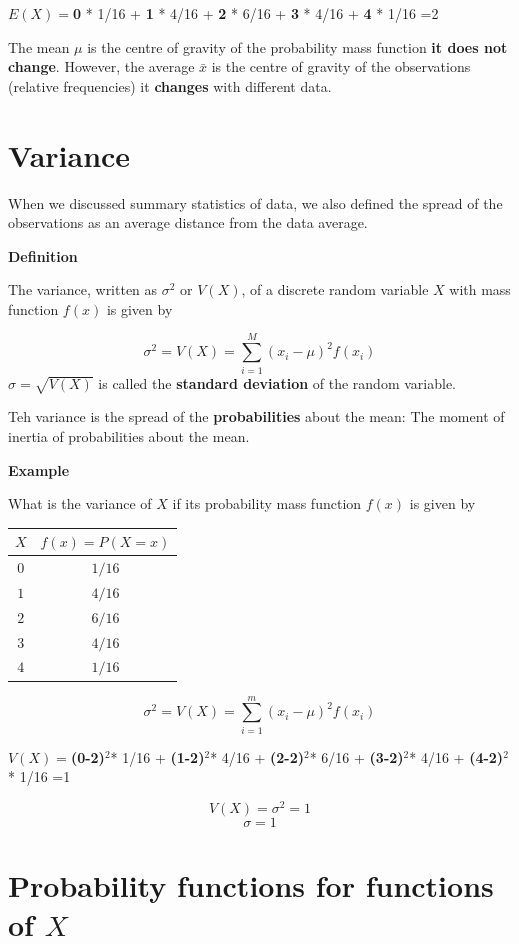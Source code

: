 \documentclass[
]{book}
\begin{document}
\(E(X)=\)\textbf{0} * 1/16 + \textbf{1} * 4/16 + \textbf{2} * 6/16 + \textbf{3} * 4/16 + \textbf{4} * 1/16 =2

The mean \(\mu\) is the centre of gravity of the probability mass function \textbf{it does not change}. However, the average \(\bar{x}\) is the centre of gravity of the observations (relative frequencies) it \textbf{changes} with different data.

\hypertarget{variance}{%
\section{Variance}\label{variance}}

When we discussed summary statistics of data, we also defined the spread of the observations as an average distance from the data average.

\textbf{Definition}

The variance, written as \(\sigma^2\) or \(V(X)\), of a discrete random variable \(X\) with mass function \(f(x)\) is given by

\[\sigma^2 = V(X)= \sum_{i=1}^M (x_i-\mu)^2 f(x_i)\]
\(\sigma=\sqrt{V(X)}\) is called the \textbf{standard deviation} of the random variable.

Teh variance is the spread of the \textbf{probabilities} about the mean: The moment of inertia of probabilities about the mean.

\textbf{Example}

What is the variance of \(X\) if its probability mass function \(f(x)\) is given by

\begin{longtable}[]{@{}cc@{}}
\toprule
\(X\) & \(f(x)=P(X=x)\) \\
\midrule
\endhead
\(0\) & \(1/16\) \\
\(1\) & \(4/16\) \\
\(2\) & \(6/16\) \\
\(3\) & \(4/16\) \\
\(4\) & \(1/16\) \\
\bottomrule
\end{longtable}

\[\sigma^2 =V(X)=\sum_{i=1}^m (x_i-\mu)^2 f(x_i)\]

\(V(X)=\)\textbf{(0-2)}\(^2\)* 1/16 + \textbf{(1-2)}\(^2\)* 4/16 + \textbf{(2-2)}\(^2\)* 6/16 + \textbf{(3-2)}\(^2\)* 4/16 + \textbf{(4-2)}\(^2\)* 1/16 =1

\[V(X)=\sigma^2=1\]
\[\sigma=1\]

\hypertarget{probability-functions-for-functions-of-x}{%
\section{\texorpdfstring{Probability functions for functions of \(X\)}{Probability functions for functions of X}}\label{probability-functions-for-functions-of-x}}
\end{document}
